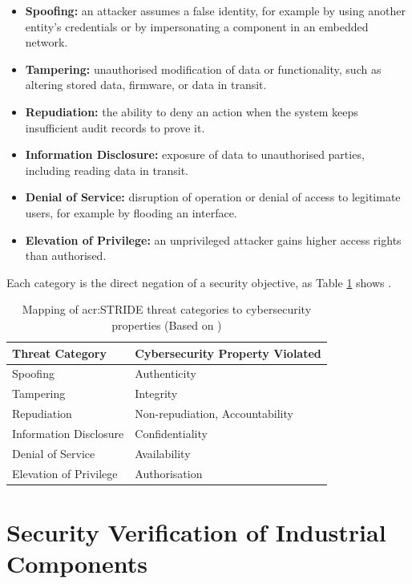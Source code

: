 \begin{itemize}
	\item \textbf{Spoofing:} an attacker assumes a false identity, for example by using another entity's credentials or by impersonating a component in an embedded network.
	\item \textbf{Tampering:} unauthorised modification of data or functionality, such as altering stored data, firmware, or data in transit.
	\item \textbf{Repudiation:} the ability to deny an action when the system keeps insufficient audit records to prove it.
	\item \textbf{Information Disclosure:} exposure of data to unauthorised parties, including reading data in transit.
	\item \textbf{Denial of Service:} disruption of operation or denial of access to legitimate users, for example by flooding an interface.
	\item \textbf{Elevation of Privilege:} an unprivileged attacker gains higher access rights than authorised.
\end{itemize}

Each category is the direct negation of a security objective, as Table \ref{tab:stride_mapping} shows \cite[p. 144]{doCarmo2025} \cite{owasp_threat_modeling_process}.
\begin{table}[H]
	\caption[Mapping of \gls{acr:STRIDE} threat categories to cybersecurity Properties]{Mapping of \gls{acr:STRIDE} threat categories to cybersecurity properties (Based on \cite[p. 144]{doCarmo2025} \cite{owasp_threat_modeling_process})}
	\label{tab:stride_mapping}
	\centering
	\begin{tabularx}{\textwidth}{X X}
		\toprule
		\textbf{Threat Category} & \textbf{Cybersecurity Property Violated} \\
		\midrule
		Spoofing & Authenticity \\
		Tampering & Integrity \\
		Repudiation & Non-repudiation, Accountability \\
		Information Disclosure & Confidentiality \\
		Denial of Service & Availability \\
		Elevation of Privilege & Authorisation \\
		\bottomrule
	\end{tabularx}
\end{table}



\section{Security Verification of Industrial Components}
\label{sec:security_testing_approaches}


